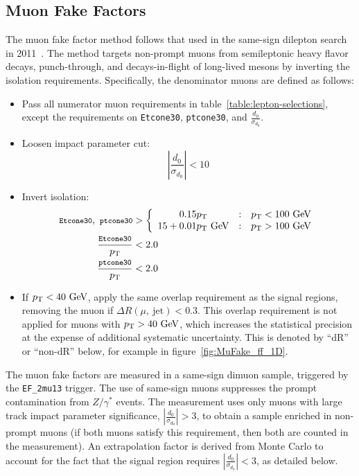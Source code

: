\subsection{Muon Fake Factors}\label{sec:muon-fake-factors}
The muon fake factor method follows that used in the same-sign dilepton search in 2011~\cite{LouiseThesis, 
SSInternal}. The method targets non-prompt muons from semileptonic heavy flavor decays, punch-through, and decays-in-flight of long-lived mesons by inverting the isolation requirements. Specifically, the denominator muons are defined as follows:
\begin{itemize}
  \item Pass all numerator muon requirements in table~\ref{table:lepton-selections}, except the requirements on \verb.Etcone30., \verb.ptcone30., and $\frac{d_0}{\sigma_{d_0}}$. 
  \item Loosen impact parameter cut:
  \begin{equation}
	|\frac{d_0}{\sigma_{d_0}}|<10
  \end{equation}
  \item Invert isolation:
  \begin{align}
	{\footnotesize \texttt{Etcone30}},\ {\footnotesize \texttt{ptcone30}} &> \left\{\begin{array}{ccc} 0.15 p_{\text{T}} & : & p_{\text{T}}<100~\mbox{GeV} \\ 15+0.01 p_{\text{T}}~\mbox{GeV} & : & p_{\text{T}}>100~\mbox{GeV} \end{array} \right. \\
	{\footnotesize \frac{\texttt{Etcone30}}{p_{\text{T}}}} &< 2.0 \\
	{\footnotesize \frac{\texttt{ptcone30}}{p_{\text{T}}}} &< 2.0 \\
  \end{align}
  \item If $p_{\text{T}}<40~\mbox{GeV}$, apply the same overlap requirement as the signal regions, removing the muon if $\Delta R (\mu,\ \mbox{jet})<0.3$. This overlap requirement is not applied for muons with $p_{\text{T}}>40~\mbox{GeV}$, which increases the statistical precision at the expense of additional systematic uncertainty. This is denoted by ``dR'' or ``non-dR'' below, for example in figure~\ref{fig:MuFake_ff_1D}.
\end{itemize}

The muon fake factors are measured in a same-sign dimuon sample, triggered by the \verb.EF_2mu13. trigger. The use of same-sign muons suppresses the prompt contamination from $Z/\gamma^{*}$ events. The measurement uses only muons with large track impact parameter significance, $|\frac{d_0}{\sigma_{d_0}}|>3$, to obtain a sample enriched in non-prompt muons (if both muons satisfy this requirement, then both are counted in the measurement). An extrapolation factor is derived from Monte Carlo to account for the fact that the signal region requires $|\frac{d_0}{\sigma_{d_0}}|<3$, as detailed below.

